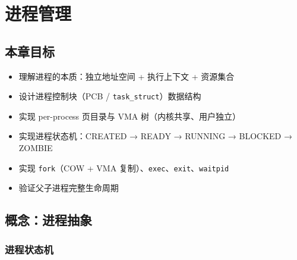 \chapter{进程管理}
\label{ch:process}

\section{本章目标}

\begin{itemize}
  \item 理解进程的本质：独立地址空间 + 执行上下文 + 资源集合
  \item 设计进程控制块（PCB / \texttt{task\_struct}）数据结构
  \item 实现 per-process 页目录与 VMA 树（内核共享、用户独立）
  \item 实现进程状态机：CREATED → READY → RUNNING → BLOCKED → ZOMBIE
  \item 实现 \texttt{fork}（COW + VMA 复制）、\texttt{exec}、\texttt{exit}、\texttt{waitpid}
  \item 验证父子进程完整生命周期
\end{itemize}

\section{概念：进程抽象}
\label{sec:proc-concept}


\subsection{进程状态机}


